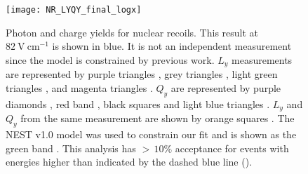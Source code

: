 \begin{figure}
\centering
\texttt{[image: NR\_LYQY\_final\_logx]}
\caption{Photon and charge yields for nuclear recoils.  This result at $82\ \mathrm{V\ cm^{-1}}$ is shown in blue.  It is not
an independent measurement since the model is constrained by previous work.  $L_y$ measurements are represented by purple triangles
, grey triangles , light green triangles , and magenta triangles
.  $Q_y$ are represented by purple diamonds , red band , black squares
 and light blue triangles .  $L_y$ and $Q_y$ from the same measurement are shown by orange
squares
.  The NEST v1.0 model was used to constrain our fit and is shown as the green band .  This
analysis has ${>}\, 10\%$ acceptance for events with energies higher than indicated by the dashed blue line
().}
\label{fig:er_nr_calibrations_results_ly_qy_nr}
\end{figure}